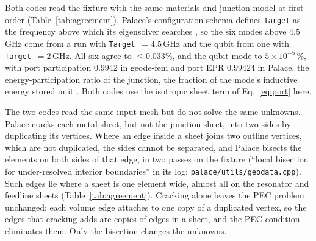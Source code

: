 \documentclass{anvil-paper}
\begin{document}
Both codes read the fixture with the same materials and junction model at
first order (Table~\ref{tab:agreement}). Palace's configuration schema
defines \texttt{Target} as the frequency above which its eigensolver
searches \citep{palace}, so the six modes above $4.5$\,GHz come from a run
with \texttt{Target}~$=4.5$\,GHz and the qubit from one with
\texttt{Target}~$=2$\,GHz. All six agree to $\leq 0.033\%$, and the qubit mode to $5\times10^{-5}\,\%$, with port
participation $0.9942$ in geode-fem and port EPR $0.99424$ in Palace, the
energy-participation ratio of the junction, the fraction of the mode's
inductive energy stored in it \citep{minev2021energy}. Both codes use the
isotropic sheet term of Eq.~\eqref{eq:port} here.

The two codes read the same input mesh but do not solve the same unknowns.
Palace cracks each metal sheet, but not the junction sheet, into two sides
by duplicating its vertices. Where an edge inside a sheet joins two outline
vertices, which are not duplicated, the sides cannot be separated, and
Palace bisects the elements on both sides of that edge, in two passes on
the fixture (``local bisection
for under-resolved interior boundaries'' in its log;
\texttt{palace/utils/geodata.cpp}). Such edges lie where a sheet is one
element wide, almost all on the resonator and feedline sheets
(Table~\ref{tab:agreement}). Cracking alone leaves the PEC problem unchanged: each
volume edge attaches to one copy of a duplicated vertex, so the edges that
cracking adds are copies of edges in a sheet, and the PEC condition
eliminates them. Only the bisection changes the unknowns.
\end{document}
